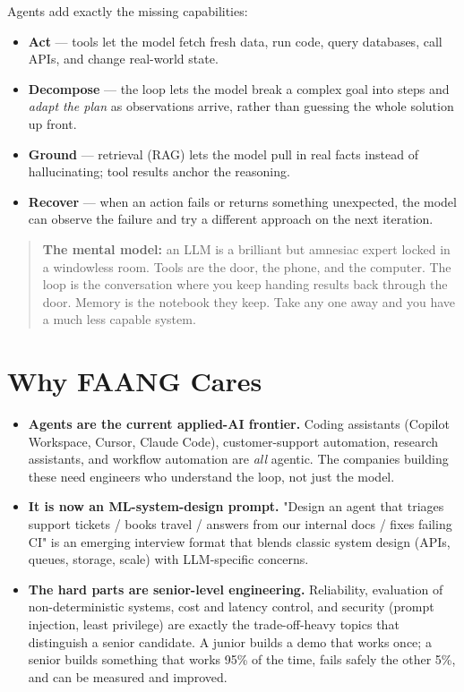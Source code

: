 \documentclass[11pt]{article}
\providecommand{\tightlist}{\setlength{\itemsep}{1pt}\setlength{\parskip}{0pt}}
\begin{document}
Agents add exactly the missing capabilities:

\begin{itemize}
\tightlist
\item
  \textbf{Act} --- tools let the model fetch fresh data, run code, query databases, call APIs, and change real-world state.
\item
  \textbf{Decompose} --- the loop lets the model break a complex goal into steps and \emph{adapt the plan} as observations arrive, rather than guessing the whole solution up front.
\item
  \textbf{Ground} --- retrieval (RAG) lets the model pull in real facts instead of hallucinating; tool results anchor the reasoning.
\item
  \textbf{Recover} --- when an action fails or returns something unexpected, the model can observe the failure and try a different approach on the next iteration.
\end{itemize}

\begin{quote}
\textbf{The mental model:} an LLM is a brilliant but amnesiac expert locked in a windowless room. Tools are the door, the phone, and the computer. The loop is the conversation where you keep handing results back through the door. Memory is the notebook they keep. Take any one away and you have a much less capable system.
\end{quote}

\section{Why FAANG Cares}\label{why-faang-cares}

\begin{itemize}
\tightlist
\item
  \textbf{Agents are the current applied-AI frontier.} Coding assistants (Copilot Workspace, Cursor, Claude Code), customer-support automation, research assistants, and workflow automation are \emph{all} agentic. The companies building these need engineers who understand the loop, not just the model.
\item
  \textbf{It is now an ML-system-design prompt.} "Design an agent that triages support tickets / books travel / answers from our internal docs / fixes failing CI" is an emerging interview format that blends classic system design (APIs, queues, storage, scale) with LLM-specific concerns.
\item
  \textbf{The hard parts are senior-level engineering.} Reliability, evaluation of non-deterministic systems, cost and latency control, and security (prompt injection, least privilege) are exactly the trade-off-heavy topics that distinguish a senior candidate. A junior builds a demo that works once; a senior builds something that works 95\% of the time, fails safely the other 5\%, and can be measured and improved.
\end{itemize}
\end{document}
